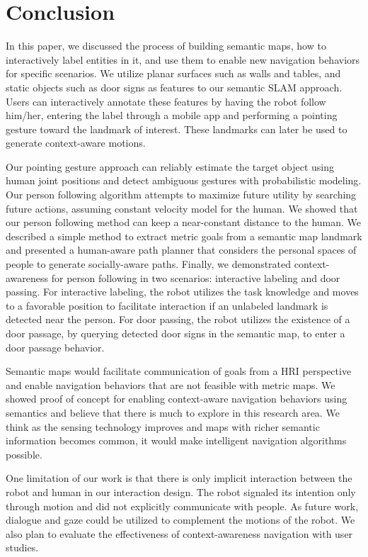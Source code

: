 \documentclass{tADR2e}
\begin{document}
\section{Conclusion}
\label{sec:conclusions}

In this paper, we discussed the process of building semantic maps, how to interactively label entities in it, and use them to enable new navigation behaviors for specific scenarios. We utilize planar surfaces such as walls and tables, and static objects such as door signs as features to our semantic SLAM approach. Users can interactively annotate these features by having the robot follow him/her, entering the label through a mobile app and performing a pointing gesture toward the landmark of interest. These landmarks can later be used to generate context-aware motions.

Our pointing gesture approach can reliably estimate the target object using human joint positions and detect ambiguous gestures with probabilistic modeling. Our person following algorithm attempts to maximize future utility by searching future actions, assuming constant velocity model for the human. We showed that our person following method can keep a near-constant distance to the human. We described a simple method to extract metric goals from a semantic map landmark and presented a human-aware path planner that considers the personal spaces of people to generate socially-aware paths. Finally, we demonstrated context-awareness for person following in two scenarios: interactive labeling and door passing. For interactive labeling, the robot utilizes the task knowledge and moves to a favorable position to facilitate interaction if an unlabeled landmark is detected near the person. For door passing, the robot utilizes the existence of a door passage, by querying detected door signs in the semantic map, to enter a door passage behavior.

Semantic maps would facilitate communication of goals from a HRI perspective and enable navigation behaviors that are not feasible with metric maps. We showed proof of concept for enabling context-aware navigation behaviors using semantics and believe that there is much to explore in this research area. We think as the sensing technology improves and maps with richer semantic information becomes common, it would make intelligent navigation algorithms possible.

One limitation of our work is that there is only implicit interaction between the robot and human in our interaction design. The robot signaled its intention only through motion and did not explicitly communicate with people. As future work, dialogue and gaze could be utilized to complement the motions of the robot. We also plan to evaluate the effectiveness of context-awareness navigation with user studies.



\end{document}
